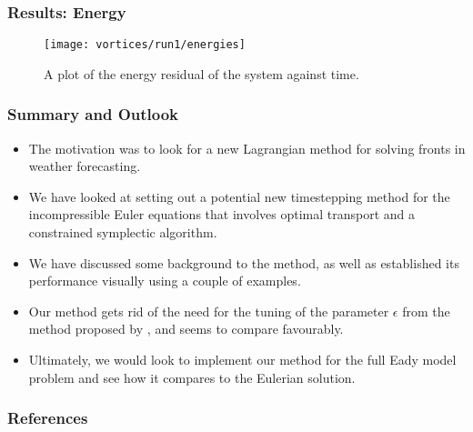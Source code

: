 \documentclass[10pt]{beamer}
\begin{document}
\frame
{
  \frametitle{Results: Energy}

\begin{figure}[H]
\texttt{[image: vortices/run1/energies]}
\centering
\caption{A plot of the energy residual of the system against time. }
\centering
\label{fig:error-N}
\end{figure}

}

\frame
{
  \frametitle{Summary and Outlook}

  \begin{itemize}
  \item The motivation was to look for a new Lagrangian method for solving fronts in weather forecasting. 
 
  \item We have looked at setting out a potential new timestepping method for the incompressible Euler equations that involves optimal transport and a constrained symplectic algorithm. 
  
  \item We have discussed some background to the method, as well as established its performance visually using a couple of examples.
  
  \item Our method gets rid of the need for the tuning of the parameter \(\epsilon\) from the method proposed by \cite{gallouet2016lagrangian}, and seems to compare favourably.
  
  \item Ultimately, we would look to implement our method for the full Eady model problem and see how it compares to the Eulerian solution.
  
  \end{itemize}
}

\frame
{
  \frametitle{References}
  
}
\end{document}
